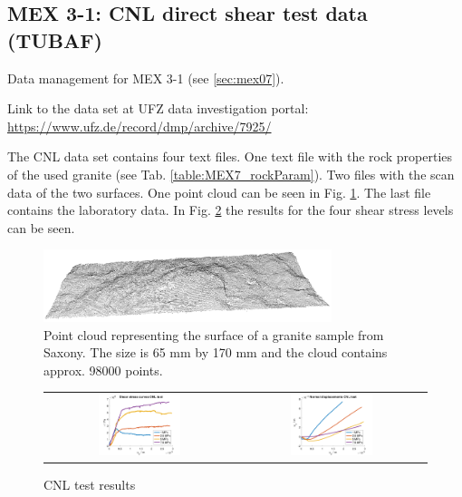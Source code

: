 \subsection{MEX 3-1: CNL direct shear test data (TUBAF)}\label{DataManMex3-1CNL}

Data management for MEX 3-1 (see \ref{sec:mex07}).

Link to the data set at UFZ data investigation portal: \url{https://www.ufz.de/record/dmp/archive/7925/}

The CNL data set contains four text files. One text file with the rock properties of the used granite (see Tab. \ref{table:MEX7_rockParam}). Two files with the scan data of the two surfaces. One point cloud can be seen in Fig. \ref{fig:DataCNLGranitePointCloud}. The last file contains the laboratory data. In Fig. \ref{fig:DataCNLGraniteLab} the results for the four shear stress levels can be seen.

\begin{figure}[!ht]
\begin{center}
\includegraphics[width=0.75\textwidth]{./figures/MEX7_Point_cloud.png}
\end{center}
\caption{Point cloud representing the surface of a granite sample from Saxony. The size is 65 mm by 170 mm and the cloud contains approx. 98000 points.}
\label{fig:DataCNLGranitePointCloud}
\end{figure}

\begin{figure}[!ht]
\begin{tabular}{cc}
\includegraphics[width=0.45\textwidth]{./figures/CNLShearCurvesAll.png}     
& 
\includegraphics[width=0.45\textwidth]{./figures/CNLDilatationAll.png} 
\end{tabular}
\caption{CNL test results}
\label{fig:DataCNLGraniteLab}
\end{figure}


